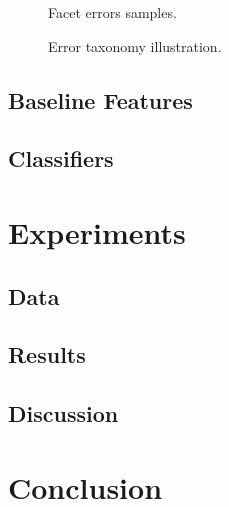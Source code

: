 \documentclass[runningheads]{llncs}
\begin{document}
\begin{figure}[H]
\begin{center}
{{                    \caption{Facet errors samples.}\label{fig::fac_err}
                }
            }
            {
                \addtocounter{figure}{-3}
                \caption{\label{fig::samples}Error taxonomy illustration.}
            }
        \end{center}
    \end{figure}
\subsection{Baseline Features}
\subsection{Classifiers}
\section{Experiments}
\subsection{Data}
\subsection{Results}
\subsection{Discussion}
\section{Conclusion}



\end{document}
